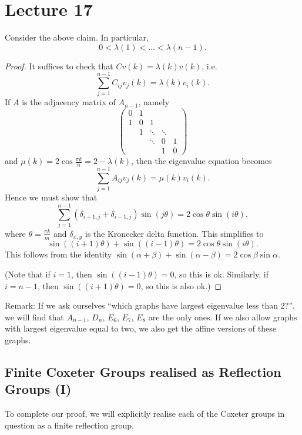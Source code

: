 \section{Lecture 17}

Consider the above claim. In particular,
\[
    0 < \lambda(1) < \dots < \lambda(n-1).
\]
\begin{proof}
It suffices to check that $C v(k) = \lambda(k) v(k)$, i.e.
\[
    \sum_{j=1}^{n-1} C_{ij} v_j(k) = \lambda(k) v_i(k).
\]
If $A$ is the adjacency matrix of $A_{n-1}$, namely
\[
    \begin{pmatrix}
        0 & 1 \\
        1 & 0 & 1 \\
          & 1 & \ddots & \ddots \\
          &   & \ddots & 0 & 1 \\
          &   &        & 1 & 0
    \end{pmatrix}
\]
and $\mu(k) = 2 \cos \frac{\pi k}{n} = 2 - \lambda(k)$, then the eigenvalue
equation becomes
\[
    \sum_{j=1}^{n-1} A_{ij} v_j(k) = \mu(k) v_i(k).
\]
Hence we must show that
\[
    \sum_{j=1}^{n-1} (\delta_{i+1,j} + \delta_{i-1,j}) \sin (j \theta)
    = 2 \cos \theta \sin (i \theta),
\]
where $\theta = \frac{\pi k}{m}$ and $\delta_{x,y}$ is the Kronecker delta function.
This simplifies to
\[
    \sin((i+1) \theta) + \sin ((i-1)\theta) = 2 \cos \theta \sin (i \theta).
\]
This follows from the identity $\sin (\alpha + \beta) + \sin (\alpha - \beta)
= 2 \cos \beta \sin \alpha$.

(Note that if $i=1$, then $\sin ((i-1) \theta) = 0$, so this is ok. Similarly,
if $i=n-1$, then $\sin((i+1) \theta) = 0$, so this is also ok.)
\end{proof}

Remark: If we ask ourselves ``which graphs have largest eigenvalue less than
2?'', we will find that $A_{n-1}$, $D_n$, $E_6$, $E_7$, $E_8$ are the only ones.
If we also allow graphs with largest eigenvalue equal to two, we also get the
affine versions of these graphs.
\\

\subsection{Finite Coxeter Groups realised as Reflection Groups (I)}

To complete our proof, we will explicitly realise each of the Coxeter groups in
question as a finite reflection group.

